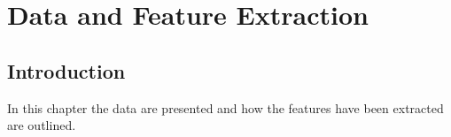 \chapter{Data and Feature Extraction}

\section{Introduction}
In this chapter the data are presented and how the features have been extracted are outlined.

 